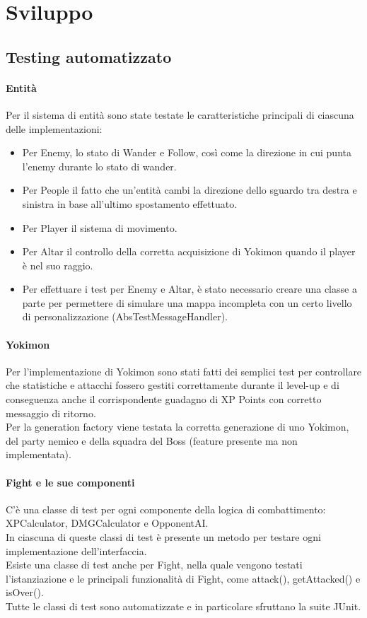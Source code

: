 \documentclass[a4paper,12pt]{report}
\begin{document}
\chapter{Sviluppo}
\section{Testing automatizzato}
\subsubsection{Entità}
Per il sistema di entità sono state testate le caratteristiche principali di ciascuna delle implementazioni:
\begin{itemize}
    \item Per Enemy, lo stato di Wander e Follow, così come la direzione in cui punta l’enemy durante lo stato di wander.
    \item Per People il fatto che un’entità cambi la direzione dello sguardo tra destra e sinistra in base all’ultimo spostamento effettuato.
    \item Per Player il sistema di movimento.
    \item Per Altar il controllo della corretta acquisizione di Yokimon quando il player è nel suo raggio.
    \item Per effettuare i test per Enemy e Altar, è stato necessario creare una classe a parte per permettere di simulare una mappa incompleta con un certo livello di personalizzazione (AbsTestMessageHandler).
\end{itemize}
\subsubsection{Yokimon}
Per l’implementazione di Yokimon sono stati fatti dei semplici test per controllare che statistiche e attacchi fossero gestiti correttamente durante il level-up e di conseguenza anche il corrispondente guadagno di XP Points con corretto messaggio di ritorno. \\
%
Per la generation factory viene testata la corretta generazione di uno Yokimon, del party nemico e della squadra del Boss (feature presente ma non implementata).
\subsubsection{Fight e le sue componenti}
C’è una classe di test per ogni componente della logica di combattimento: XPCalculator, DMGCalculator e OpponentAI. \\
%
In ciascuna di queste classi di test è presente un metodo per testare ogni implementazione dell’interfaccia. \\
%
Esiste una classe di test anche per Fight, nella quale vengono testati l’istanziazione e le principali funzionalità di Fight, come attack(), getAttacked() e isOver(). \\
%
Tutte le classi di test sono automatizzate e in particolare sfruttano la suite JUnit.
\end{document}
